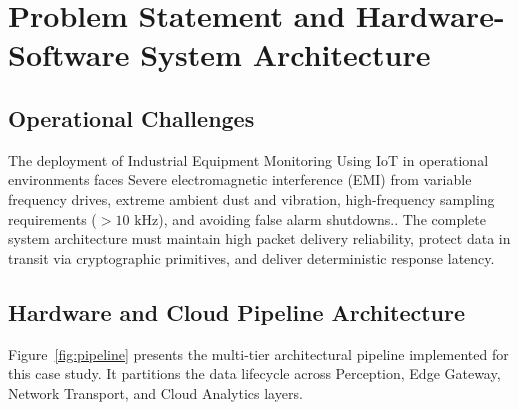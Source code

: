 \section{Problem Statement and Hardware-Software System Architecture}

\subsection{Operational Challenges}
The deployment of Industrial Equipment Monitoring Using IoT in operational environments faces Severe electromagnetic interference (EMI) from variable frequency drives, extreme ambient dust and vibration, high-frequency sampling requirements ($>10\text{ kHz}$), and avoiding false alarm shutdowns.. The complete system architecture must maintain high packet delivery reliability, protect data in transit via cryptographic primitives, and deliver deterministic response latency.

\subsection{Hardware and Cloud Pipeline Architecture}
Figure~\ref{fig:pipeline} presents the multi-tier architectural pipeline implemented for this case study. It partitions the data lifecycle across Perception, Edge Gateway, Network Transport, and Cloud Analytics layers.

